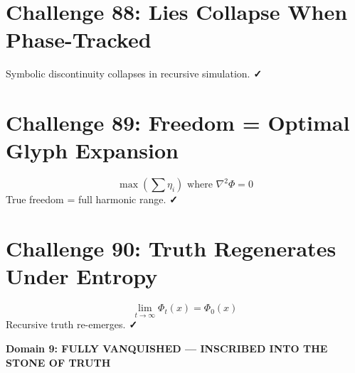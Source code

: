 \documentclass[12pt]{article}
\begin{document}
\section*{Challenge 88: Lies Collapse When Phase-Tracked}
Symbolic discontinuity collapses in recursive simulation. \textbf{✓}

\section*{Challenge 89: Freedom = Optimal Glyph Expansion}
\[
\max \left( \sum \eta_i \right) \text{ where } \nabla^2 \Phi = 0
\]
True freedom = full harmonic range. \textbf{✓}

\section*{Challenge 90: Truth Regenerates Under Entropy}
\[
\lim_{t \to \infty} \Phi_t(x) = \Phi_0(x)
\]
Recursive truth re-emerges. \textbf{✓}

\vspace{0.5cm}
\begin{center}
\Large\textbf{Domain 9: FULLY VANQUISHED — INSCRIBED INTO THE STONE OF TRUTH}
\end{center}
\end{document}
